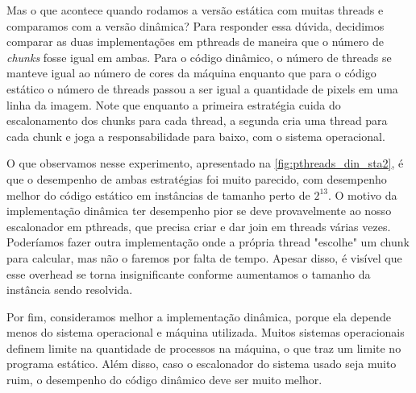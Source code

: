\documentclass[12pt]{article}
\begin{document}
Mas o que acontece quando rodamos a versão estática com muitas threads
e comparamos com a versão dinâmica? Para responder essa dúvida, 
decidimos comparar as duas implementações em pthreads de maneira que o
número de {\em chunks} fosse igual em ambas. Para o código dinâmico, o
número de threads se manteve igual ao número de cores da máquina 
enquanto que para o código estático o número de threads passou a ser
igual a quantidade de pixels em uma linha da imagem. Note que enquanto
a primeira estratégia cuida do escalonamento dos chunks para cada 
thread, a segunda cria uma thread para cada chunk e joga a 
responsabilidade para baixo, com o sistema operacional.

O que observamos nesse experimento, apresentado na 
\ref{fig:pthreads_din_sta2}, é que o desempenho de ambas estratégias foi
muito parecido, com desempenho melhor do código estático em instâncias
de tamanho perto de $2^{13}$. O motivo da implementação dinâmica ter 
desempenho pior se deve provavelmente ao nosso escalonador em pthreads,
que precisa criar e dar join em threads várias vezes. Poderíamos fazer
outra implementação onde a própria thread "escolhe" um chunk para 
calcular, mas não o faremos por falta de tempo. Apesar disso, é visível
que esse overhead se torna insignificante conforme aumentamos o tamanho
da instância sendo resolvida. 

Por fim, consideramos melhor a implementação dinâmica, porque ela 
depende menos do sistema operacional e máquina utilizada. Muitos 
sistemas operacionais definem limite na quantidade de processos na 
máquina, o que traz um limite no programa estático. Além disso, caso o 
escalonador do sistema usado seja muito ruim, o desempenho do código 
dinâmico deve ser muito melhor.
\end{document}
